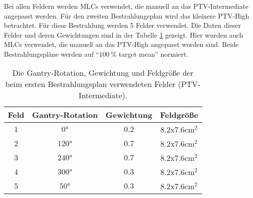 Bei allen Feldern werden MLCs verwendet, die manuell an das PTV-Intermediate angepasst werden.
Für den zweiten Bestrahlungsplan wird das kleinere PTV-High betrachtet. Für diese Bestrahlung werden 5 Felder verwendet.
Die Daten dieser Felder und deren Gewichtungen sind in der Tabelle \ref{tab:Felder2} gezeigt.
Hier wurden auch MLCs verwendet, die manuell an das PTV-High angepasst worden sind.
Beide Bestrahlungspläne werden auf \enquote{$\SI{100}{\percent}$ target mean} normiert.

\begin{table}
	\centering
	\caption{Die Gantry-Rotation, Gewichtung und Feldgröße der beim ersten Bestrahlungsplan verwendeten Felder (PTV-Intermediate).}
	\label{tab:Felder2}
	\begin{tabular}{c c c c}
		\toprule
		Feld & Gantry-Rotation & Gewichtung & Feldgröße\\
		\midrule
		$1$ & $0°$   & $0.2$ & $\num{8.2}$x$\num{7.6} \si{\centi\meter\squared}$ \\
		$2$ & $120°$  & $0.7$ & $\num{8.2}$x$\num{7.6} \si{\centi\meter\squared}$ \\
		$3$ & $240°$ & $0.7$ & $\num{8.2}$x$\num{7.6} \si{\centi\meter\squared}$ \\
		$4$ & $300°$ & $0.3$ & $\num{8.2}$x$\num{7.6} \si{\centi\meter\squared}$ \\
		$5$ & $50°$ & $0.3$ & $\num{8.2}$x$\num{7.6} \si{\centi\meter\squared}$ \\
		\bottomrule
	\end{tabular}
\end{table}
